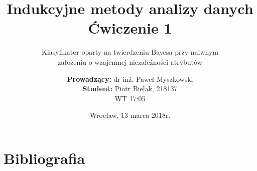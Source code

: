 \documentclass{scrartcl}
\title{Indukcyjne metody analizy danych\\Ćwiczenie 1}
\subtitle{Klasyfikator oparty na twierdzeniu Bayesa przy naiwnym\\założeniu o wzajemnej niezależności atrybutów}
\author{\textbf{Prowadzący:} dr inż. Paweł Myszkowski \\ \textbf{Student:} Piotr Bielak, 218137\\WT 17:05}
\date{Wrocław, 13 marca 2018r.}
\begin{document}
\nocite{*}
\maketitle

\pagebreak
\tableofcontents

\pagebreak






\section{Bibliografia}
\end{document}
